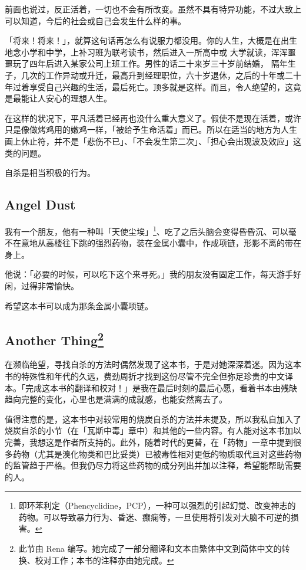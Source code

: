 \documentclass[UTF8]{ctexart}
\begin{document}
前面也说过，反正活着，一切也不会有所改变。虽然不具有特异功能，不过大致上可以知道，今后的社会或自己会发生什么样的事。

「将来！将来！」，就算这句话再怎么有说服力都没用。你的人生，大概是在出生地念小学和中学，上补习班为联考读书，然后进入一所高中或 大学就读，浑浑噩噩玩了四年后进入某家公司上班工作。男性的话二十来岁三十岁前结婚， 隔年生子，几次的工作异动或升迁，最高升到经理职位，六十岁退休，之后的十年或二十年过着享受自己兴趣的生活，最后死亡。顶多就是这样。而且，令人绝望的，这竟是最能让人安心的理想人生。 

在这样的状况下，平凡活着已经再也没什么重大意义了。假使不是现在活着，或许只是像做烤鸡用的嫩鸡一样，「被给予生命活着」而已。所以在适当的地方为人生画上休止符，并不是「悲伤不已」、「不会发生第二次」、「担心会出现波及效应」这类的问题。

自杀是相当积极的行为。

\subsection{Angel Dust}

我有一个朋友，他有一种叫「天使尘埃」\footnote{即环苯利定（Phencyclidine，PCP），一种可以强烈的引起幻觉、改变神志的药物。可以导致暴力行为、昏迷、癫痫等，一旦使用将引发对大脑不可逆的损害。}、吃了之后头脑会变得昏昏沉、可以毫不在意地从高楼往下跳的强烈药物，装在金属小囊中，作成项链，形影不离的带在身上。

他说：「必要的时候，可以吃下这个来寻死。」我的朋友没有固定工作，每天游手好闲，过得非常愉快。

希望这本书可以成为那条金属小囊项链。

\subsection*{Another Thing\footnote{此节由 Rena 编写。她完成了一部分翻译和文本由繁体中文到简体中文的转换、校对工作；本书的注释亦由她完成。}}

在濒临绝望，寻找自杀的方法时偶然发现了这本书，于是对她深深着迷。因为这本书的特殊性和年代的久远，费劲周折才找到这份尽管不完全但弥足珍贵的中文译本。「完成这本书的翻译和校对！」是我在最后时刻的最后心愿，看着书本由残缺趋向完整的变化，心里也是满满的成就感，也能安然离去了。

值得注意的是，这本书中对较常用的烧炭自杀的方法并未提及，所以我私自加入了烧炭自杀的小节（在「瓦斯中毒」章中）和其他的一些内容。有人能对这本书加以完善，我想这是作者所支持的。此外，随着时代的更替，在「药物」一章中提到很多药物（尤其是溴化物类和巴比妥类）已被毒性相对更低的物质取代且对这些药物的监管趋于严格。但我仍尽力将这些药物的成分列出并加以注释，希望能帮助需要的人。
\end{document}
